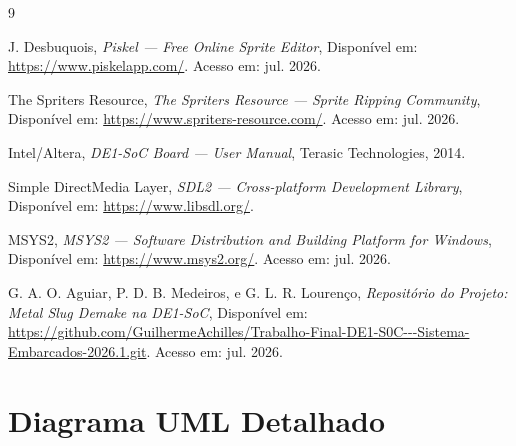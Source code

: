 \documentclass[10pt,twocolumn,letterpaper]{article}
\begin{document}
\begin{thebibliography}{9}

J. Desbuquois,
\textit{Piskel --- Free Online Sprite Editor},
Disponível em: \url{https://www.piskelapp.com/}.
Acesso em: jul. 2026.

The Spriters Resource,
\textit{The Spriters Resource --- Sprite Ripping Community},
Disponível em: \url{https://www.spriters-resource.com/}.
Acesso em: jul. 2026.

Intel/Altera,
\textit{DE1-SoC Board --- User Manual},
Terasic Technologies, 2014.

Simple DirectMedia Layer,
\textit{SDL2 --- Cross-platform Development Library},
Disponível em: \url{https://www.libsdl.org/}.

MSYS2,
\textit{MSYS2 --- Software Distribution and Building Platform for Windows},
Disponível em: \url{https://www.msys2.org/}.
Acesso em: jul. 2026.

G. A. O. Aguiar, P. D. B. Medeiros, e G. L. R. Lourenço,
\textit{Repositório do Projeto: Metal Slug Demake na DE1-SoC},
Disponível em: \url{https://github.com/GuilhermeAchilles/Trabalho-Final-DE1-S0C---Sistema-Embarcados-2026.1.git}.
Acesso em: jul. 2026.

\end{thebibliography}

\onecolumn
\appendix
\section{Diagrama UML Detalhado}
\label{appendix:uml}
\end{document}

